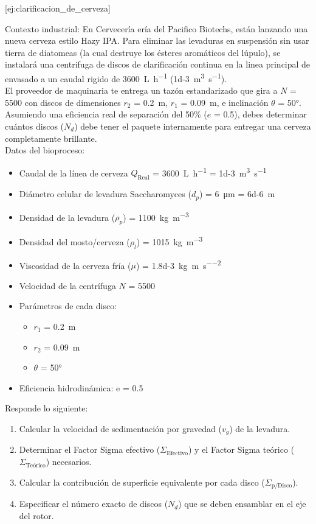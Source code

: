 \documentclass{AsignaturaResumen}
\begin{document}
[ej:clarificacion_de_cerveza]{
    Contexto industrial: En Cervecería ería del Pacifico Biotechs, están lanzando una nueva cerveza estilo Hazy IPA. Para eliminar las levaduras en suspensión sin usar tierra de diatomeas (la cual destruye los ésteres aromáticos del lúpulo), se instalará una centrifuga de discos de clarificación continua en la linea principal de envasado a un caudal rigido de \qty{3600}{\L\per\hour} (\qty{1d-3}{\m\cubed\per\s}). \\
    El proveedor de maquinaria te entrega un tazón estandarizado que gira a $N$ = \qty{5500}{\rpm} con discos de dimensiones $r_{2}$ = \qty{0.2}{\m}, $r_{1}$ = \qty{0.09}{\m}, e inclinación $\theta$ = 50°. Asumiendo una eficiencia real de separación del 50\% ($e$ = 0.5), debes determinar cuántos discos ($N_{d}$) debe tener el paquete internamente para entregar una cerveza completamente brillante. \\
    Datos del bioproceso:
    \begin{itemize}
        \item Caudal de la línea de cerveza $Q_{\text{Real}}$ = \qty{3600}{\L\per\hour} = \qty{1d-3}{\m\cubed\per\s}
        \item Diámetro celular de levadura Saccharomyces ($d_{p}$) = \qty{6}{\micro\m} = \qty{6d-6}{\m}
        \item Densidad de la levadura ($\rho_{p}$) = \qty{1100}{\kg\per\m\cubed}
        \item Densidad del mosto/cerveza ($\rho_{l}$) = \qty{1015}{\kg\per\m\cubed}
        \item Viscosidad de la cerveza fría ($\mu$) = \qty{1.8d-3}{\kg\per\m\per\s\squared}
        \item Velocidad de la centrífuga $N$ = \qty{5500}{\rpm}
        \item Parámetros de cada disco:
        \begin{itemize}
	        \item $r_{1}$ = \qty{0.2}{\m}
	        \item $r_{2}$ = \qty{0.09}{\m}
	        \item $\theta$ = 50°
        \end{itemize}
        \item Eficiencia hidrodinámica: e = 0.5
    \end{itemize}
    Responde lo siguiente:
    \begin{enumerate}
        \item Calcular la velocidad de sedimentación por gravedad ($v_{g}$) de la levadura.
        \item Determinar el Factor Sigma efectivo ($\Sigma_{\text{Efectivo}}$) y el Factor Sigma teórico ($\Sigma_{\text{Teórico}}$) necesarios.
        \item Calcular la contribución de superficie equivalente por cada disco ($\Sigma_{\text{p/Disco}}$).
        \item Especificar el número exacto de discos ($N_{d}$) que se deben ensamblar en el eje del rotor.
    \end{enumerate}
} \clearpage
\end{document}
